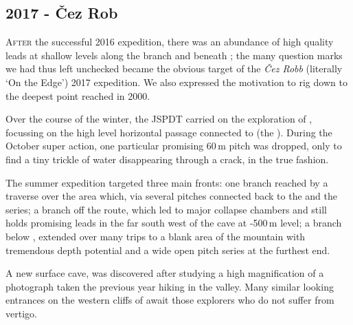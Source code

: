 \newpage
  
\begin{tcolorbox}

\chapter{2017 - Čez Rob}
	
	\lettrine{A}{fter} the successful 2016 expedition, there was an abundance of high quality leads at shallow levels along the  branch and beneath ; the many question marks we had thus left unchecked became the obvious target of the \emph{ Čez Robb} (literally `On the Edge') 2017 expedition. We also expressed the motivation to rig down to the deepest point reached in 2000.

	Over the course of the winter, the JSPDT carried on the exploration of , focussing on the high level horizontal passage connected to  (the ). During the October super action, one particular promising 60\,m pitch was dropped, only to find a tiny trickle of water disappearing through a crack, in the true  fashion.

	The summer expedition targeted three main fronts: one branch reached by a traverse over the  area which, via several pitches connected back to the  and the  series; a branch off the  route, which led to major collapse chambers and still holds promising leads in the far south west of the cave at -500\,m level; a branch below , extended over many trips to a blank area of the mountain with tremendous depth potential and a wide open pitch series at the furthest end.

	A new surface cave,  was discovered after studying a high magnification of a photograph taken the previous year hiking in the  valley. Many similar looking entrances on the western cliffs of  await those explorers who do not suffer from vertigo.

\end{tcolorbox}


